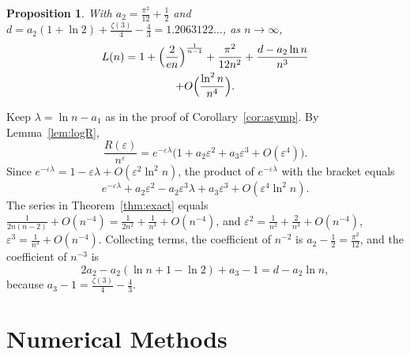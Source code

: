 \documentclass[journal]{IEEEtran}
\newtheorem{proposition}{Proposition}
\newcommand{\eps}{\varepsilon}
\begin{document}
\begin{proposition}\label{prop:higher}
With $a_2=\frac{\pi^2}{12}+\frac12$ and $d=a_2(1+\ln2)+\frac{\zeta(3)}{4}-\frac43
=1.2063122\ldots$, as $n\to\infty$,
\begin{multline*}
  L(n)=1+\Bigl(\frac{2}{en}\Bigr)^{\frac{1}{n-1}}+\frac{\pi^2}{12n^2}
  +\frac{d-a_2\ln n}{n^3}\\
  +O\Bigl(\frac{\ln^2n}{n^4}\Bigr).
\end{multline*}
\end{proposition}

\begin{IEEEproof}
Keep $\lambda=\ln n-a_1$ as in the proof of Corollary~\ref{cor:asymp}. By
Lemma~\ref{lem:logR},
\[
  \frac{R(\eps)}{n^{\eps}}=e^{-\eps\lambda}\bigl(1+a_2\eps^2+a_3\eps^3+O(\eps^4)\bigr).
\]
Since $e^{-\eps\lambda}=1-\eps\lambda+O(\eps^2\ln^2n)$, the product of $e^{-\eps\lambda}$ with
the bracket equals
\[
  e^{-\eps\lambda}+a_2\eps^2-a_2\eps^3\lambda+a_3\eps^3+O(\eps^4\ln^2n).
\]
The series in Theorem~\ref{thm:exact} equals $\frac{1}{2n(n-2)}+O(n^{-4})
=\frac{1}{2n^2}+\frac{1}{n^3}+O(n^{-4})$, and $\eps^2=\frac{1}{n^2}+\frac{2}{n^3}+O(n^{-4})$,
$\eps^3=\frac{1}{n^3}+O(n^{-4})$. Collecting terms, the coefficient of $n^{-2}$ is
$a_2-\frac12=\frac{\pi^2}{12}$, and the coefficient of $n^{-3}$ is
\[
  2a_2-a_2(\ln n+1-\ln2)+a_3-1=d-a_2\ln n,
\]
because $a_3-1=\frac{\zeta(3)}{4}-\frac43$.
\end{IEEEproof}

\section{Numerical Methods}\label{app:numerics}
\end{document}
